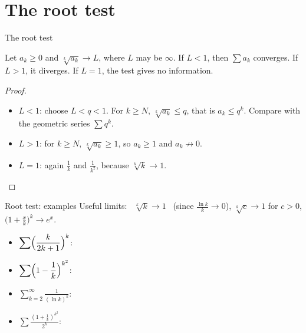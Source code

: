 \documentclass{wosm-slides}
\begin{document}
\section{The root test}

\begin{frame}{The root test}
  \begin{theorem}
    Let $a_k \ge 0$ and $\sqrt[k]{a_k} \to L$, where $L$ may be $\infty$.
    If $L < 1$, then $\sum a_k$ converges. If $L > 1$, it diverges.
    If $L = 1$, the test gives no information.
  \end{theorem}
  \pause
  \begin{proof}
    \begin{itemize}
      \item $L < 1$: choose $L < q < 1$. For $k \ge N$, $\sqrt[k]{a_k} \le q$, that is
        $a_k \le q^k$. Compare with the geometric series $\sum q^k$.
      \item $L > 1$: for $k \ge N$, $\sqrt[k]{a_k} \ge 1$, so $a_k \ge 1$ and
        $a_k \not\to 0$.
      \item $L = 1$: again $\frac1k$ and $\frac1{k^2}$, because $\sqrt[k]{k} \to 1$. \qedhere
    \end{itemize}
  \end{proof}
\end{frame}

\begin{frame}{Root test: examples}
  Useful limits: \ $\sqrt[k]{k} \to 1$ \ (since $\frac{\ln k}{k} \to 0$), \quad
  $\sqrt[k]{c} \to 1$ for $c > 0$, \quad $\bigl(1 + \frac{x}{k}\bigr)^k \to e^x$.
  \begin{itemize}
    \item $\displaystyle\sum \Bigl(\frac{k}{2k+1}\Bigr)^k$:
    \item $\displaystyle\sum \Bigl(1 - \frac1k\Bigr)^{k^2}$:
    \item $\displaystyle\sum_{k=2}^\infty \frac{1}{(\ln k)^k}$:
    \item $\displaystyle\sum \frac{(1 + \frac1k)^{k^2}}{2^k}$:
  \end{itemize}
\end{frame}
\end{document}
